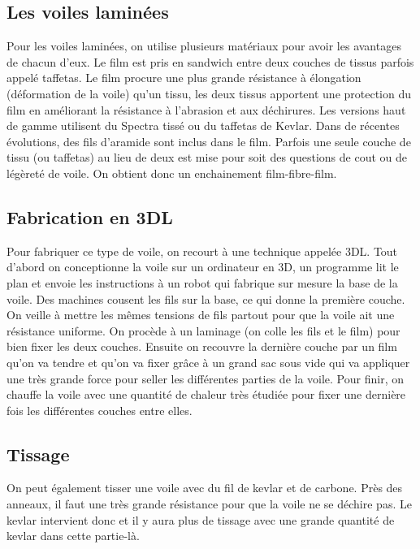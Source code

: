 \begin{multicols}{2}
\subsection{Les voiles laminées}
Pour les voiles laminées, on utilise plusieurs matériaux pour avoir les avantages de chacun d’eux.
Le film est pris en sandwich entre deux couches de tissus parfois appelé taffetas. Le film procure une plus grande résistance à élongation (déformation de la voile) qu'un tissu, les deux tissus apportent une protection du film en améliorant la résistance à l'abrasion et aux déchirures. Les versions haut de gamme utilisent du Spectra tissé ou du taffetas de Kevlar. Dans de récentes évolutions, des fils d'aramide sont inclus dans le film. Parfois une seule couche de tissu (ou taffetas) au lieu de deux est mise pour soit des questions de cout ou de légèreté de voile.  On obtient donc un enchainement film-fibre-film. 
\subsection{Fabrication en 3DL} Pour fabriquer ce type de voile, on recourt à une technique appelée 3DL.  Tout d’abord on conceptionne la voile sur un ordinateur en 3D, un programme lit le plan et envoie les instructions à un robot qui fabrique sur mesure la base de la voile.  Des machines cousent les fils sur la base, ce qui donne la première couche.  On veille à mettre les mêmes tensions de fils partout pour que la voile ait une résistance uniforme.   On procède à un laminage (on colle les fils et le film) pour bien fixer les deux couches.   Ensuite on recouvre la dernière couche par un film qu’on va tendre et qu’on va fixer grâce à un grand sac sous vide qui va appliquer une très grande force pour seller les différentes parties de la voile.  Pour finir, on chauffe la voile avec une quantité de chaleur très étudiée pour fixer une dernière fois les différentes couches entre elles.
\subsection{Tissage}
On peut également tisser une voile avec du fil de kevlar et de carbone.  Près des anneaux, il faut une très grande résistance pour que la voile  ne se déchire pas.  Le kevlar intervient donc et il y aura plus de tissage avec une grande quantité de kevlar dans cette partie-là.

\end{multicols}
